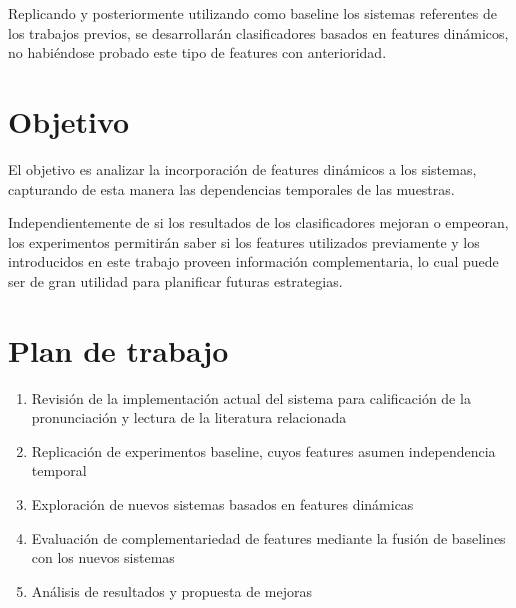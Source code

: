 \documentclass[a4paper,12pt]{article} %
\begin{document}
Replicando y posteriormente utilizando como baseline los sistemas referentes de los trabajos
previos, se desarrollarán clasificadores basados en features dinámicos, no habiéndose 
probado este tipo de features con anterioridad.


\section{Objetivo}

El objetivo es analizar la incorporación de features dinámicos a los sistemas, capturando
de esta manera las dependencias temporales de las muestras.

Independientemente de si los resultados de los clasificadores mejoran o empeoran, los
experimentos permitirán saber si los features utilizados previamente y los introducidos
en este trabajo proveen información complementaria, lo cual puede ser de gran utilidad
para planificar futuras estrategias.


\section{Plan de trabajo}

\begin{enumerate}
	\item Revisi\'on de la implementaci\'on actual del sistema para calificación de la pronunciación y lectura de la literatura relacionada
	\item Replicaci\'on de experimentos baseline, cuyos features asumen independencia temporal
	\item Exploraci\'on de nuevos sistemas basados en features din\'amicas
	\item Evaluaci\'on de complementariedad de features mediante la fusi\'on de baselines con los nuevos sistemas
	\item An\'alisis de resultados y propuesta de mejoras
\end{enumerate}
\end{document}
